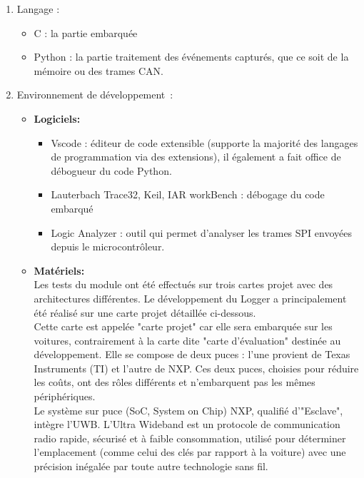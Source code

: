 \documentclass[a4paper, 12pt]{report}
\begin{document}
\begin{enumerate}
    \item Langage :
    \begin{itemize}
        \item C : la partie embarquée
        \item Python : la partie traitement des événements capturés, que ce soit de la mémoire ou des trames CAN.
    \end{itemize}
    \item Environnement de développement :
    \begin{itemize}
        \item \textbf{Logiciels:}
    \begin{itemize}
        \item Vscode : éditeur de code extensible (supporte la majorité des langages de programmation via des extensions), il également a fait office de débogueur du code Python.
        \item Lauterbach Trace32, Keil, IAR workBench : débogage du code embarqué
        \item Logic Analyzer : outil qui permet d'analyser les trames SPI envoyées depuis le microcontrôleur.
    \end{itemize}
        \item \textbf{Matériels:}\\
         Les tests du module ont été effectués sur trois cartes projet avec des architectures différentes. Le développement du Logger a principalement été réalisé sur une carte projet détaillée ci-dessous.\\

        Cette carte est appelée "carte projet" car elle sera embarquée sur les voitures, contrairement à la carte dite "carte d'évaluation" destinée au développement. Elle se compose de deux puces : l'une provient de Texas Instruments (\gls{TI}) et l'autre de \gls{NXP}. Ces deux puces, choisies pour réduire les coûts, ont des rôles différents et n'embarquent pas les mêmes périphériques.\\
        
        Le système sur puce (\acs{SoC}, System on Chip) NXP, qualifié d'"Esclave", intègre l’\ac{UWB}. L’Ultra Wideband est un protocole de communication radio rapide, sécurisé et à faible consommation, utilisé pour déterminer l’emplacement (comme celui des clés par rapport à la voiture) avec une précision inégalée par toute autre technologie sans fil.\\
        

\end{itemize}
\end{enumerate}
\end{document}
